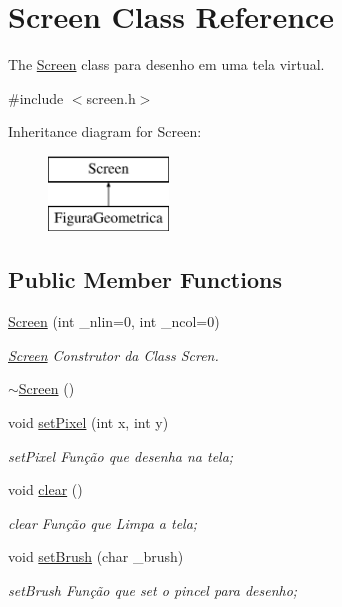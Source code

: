 \hypertarget{class_screen}{}\section{Screen Class Reference}
\label{class_screen}


The \mbox{\hyperlink{class_screen}{Screen}} class para desenho em uma tela virtual.  




{\ttfamily \#include $<$screen.\+h$>$}

Inheritance diagram for Screen\+:\begin{figure}[H]
\begin{center}
\leavevmode
\includegraphics[height=2.000000cm]{class_screen}
\end{center}
\end{figure}
\subsection*{Public Member Functions}
\begin{DoxyCompactItemize}
\item 
\mbox{\hyperlink{class_screen_ac0cb3fd57e5eb225d9756b8eb6311833}{Screen}} (int \+\_\+nlin=0, int \+\_\+ncol=0)
\begin{DoxyCompactList}\small\item\em \mbox{\hyperlink{class_screen}{Screen}} Construtor da Class Scren. \end{DoxyCompactList}\item 
\mbox{\hyperlink{class_screen_a4243bc17596af96415b09ac48205676d}{$\sim$\+Screen}} ()
\item 
void \mbox{\hyperlink{class_screen_ae6bea81c57a22d226507c3c26fa95ee0}{set\+Pixel}} (int x, int y)
\begin{DoxyCompactList}\small\item\em set\+Pixel Função que desenha na tela; \end{DoxyCompactList}\item 
void \mbox{\hyperlink{class_screen_a35e74266b2a04e37b354ceff7a5f1031}{clear}} ()
\begin{DoxyCompactList}\small\item\em clear Função que Limpa a tela; \end{DoxyCompactList}\item 
void \mbox{\hyperlink{class_screen_aebc4eb6cb5acf15a0f04c1494622ab23}{set\+Brush}} (char \+\_\+brush)
\begin{DoxyCompactList}\small\item\em set\+Brush Função que set o pincel para desenho; \end{DoxyCompactList}\end{DoxyCompactItemize}
